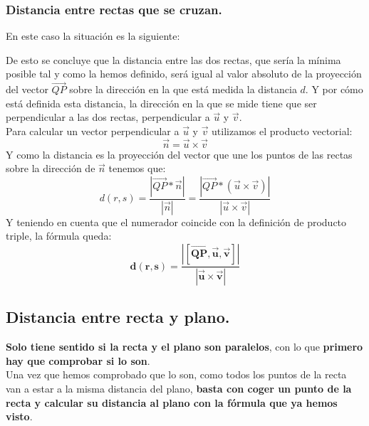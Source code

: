 \documentclass[a4paper,11pt,answers]{exam}
\begin{document}
\subsubsection{Distancia entre rectas que se cruzan.}
En este caso la situación es la siguiente:
  \begin{center}
  \end{center}
De esto se concluye que la distancia entre las dos rectas, que sería la mínima posible tal y como la hemos definido, será igual al valor absoluto de la proyección del vector $\overrightarrow{QP}$ sobre la dirección en la que está medida la distancia $d$. Y por cómo está definida esta distancia, la dirección en la que se mide tiene que ser perpendicular a las dos rectas, perpendicular a $\vec u$ y $\vec v$.\\
Para calcular un vector perpendicular a $\vec u$ y $\vec v$ utilizamos el producto vectorial:
\[\vec n = \vec u \times \vec v\]
Y como la distancia es la proyección del vector que une los puntos de las rectas sobre la dirección de $\vec n$ tenemos que:
\[d(r, s) = \frac{\left|\overrightarrow{QP} * \vec n\right|}{|\vec n|} =
\frac{\left|\overrightarrow{QP} * (\vec u \times \vec v)\right|}{|\vec u \times \vec v|}\]
Y teniendo en cuenta que el numerador coincide con la definición de producto triple, la fórmula queda:
\[\boldsymbol{d(r,s) = \frac{\left|[\overrightarrow{QP},\vec u, \vec v]\right|}{|\vec u \times \vec v|}}\]

\subsection{Distancia entre recta y plano.}
\textbf{Solo tiene sentido si la recta y el plano son paralelos}, con lo que \textbf{primero hay que comprobar si lo son}.\\

Una vez que hemos comprobado que lo son, como todos los puntos de la recta van a estar a la misma distancia del plano, \textbf{basta con coger un punto de la recta y calcular su distancia al plano con la fórmula que ya hemos visto}.
\end{document}
